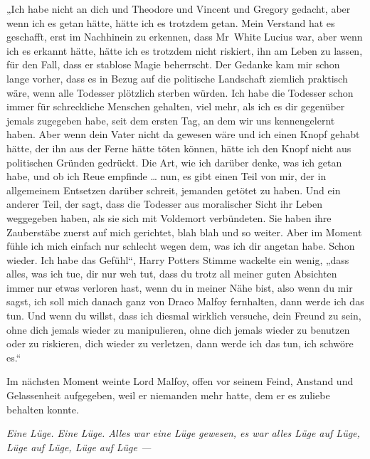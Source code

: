 „Ich habe nicht an dich und Theodore und Vincent und Gregory gedacht, aber wenn ich es getan hätte, hätte ich es trotzdem getan. Mein Verstand hat es geschafft, erst im Nachhinein zu erkennen, dass Mr~White Lucius war, aber wenn ich es erkannt hätte, hätte ich es trotzdem nicht riskiert, ihn am Leben zu lassen, für den Fall, dass er stablose Magie beherrscht. Der Gedanke kam mir schon lange vorher, dass es in Bezug auf die politische Landschaft ziemlich praktisch wäre, wenn alle Todesser plötzlich sterben würden. Ich habe die Todesser schon immer für schreckliche Menschen gehalten, viel mehr, als ich es dir gegenüber jemals zugegeben habe, seit dem ersten Tag, an dem wir uns kennengelernt haben. Aber wenn dein Vater nicht da gewesen wäre und ich einen Knopf gehabt hätte, der ihn aus der Ferne hätte töten können, hätte ich den Knopf nicht aus politischen Gründen gedrückt. Die Art, wie ich darüber denke, was ich getan habe, und ob ich Reue empfinde … nun, es gibt einen Teil von mir, der in allgemeinem Entsetzen darüber schreit, jemanden getötet zu haben. Und ein anderer Teil, der sagt, dass die Todesser aus moralischer Sicht ihr Leben weggegeben haben, als sie sich mit Voldemort verbündeten. Sie haben ihre Zauberstäbe zuerst auf mich gerichtet, blah blah und so weiter. Aber im Moment fühle ich mich einfach nur schlecht wegen dem, was ich dir angetan habe. Schon wieder. Ich habe das Gefühl“, Harry Potters Stimme wackelte ein wenig, „dass alles, was ich tue, dir nur weh tut, dass du trotz all meiner guten Absichten immer nur etwas verloren hast, wenn du in meiner Nähe bist, also wenn du mir sagst, ich soll mich danach ganz von Draco Malfoy fernhalten, dann werde ich das tun. Und wenn du willst, dass ich diesmal wirklich versuche, dein Freund zu sein, ohne dich jemals wieder zu manipulieren, ohne dich jemals wieder zu benutzen oder zu riskieren, dich wieder zu verletzen, dann werde ich das tun, ich schwöre es.“

Im nächsten Moment weinte Lord Malfoy, offen vor seinem Feind, Anstand und Gelassenheit aufgegeben, weil er niemanden mehr hatte, dem er es zuliebe behalten konnte.

\emph{Eine Lüge. Eine Lüge. Alles war eine Lüge gewesen, es war alles Lüge auf Lüge, Lüge auf Lüge, Lüge auf Lüge —}


